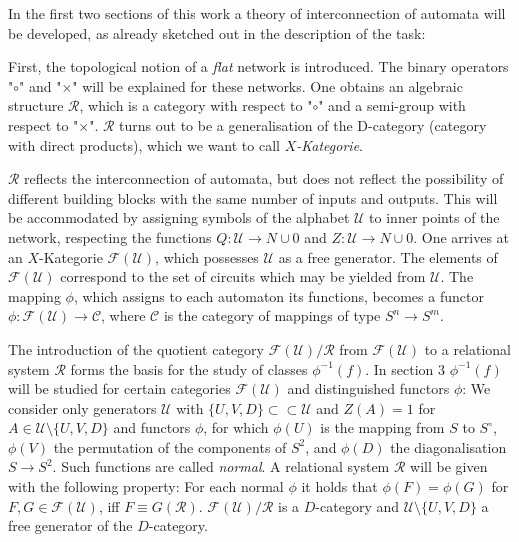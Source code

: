 \documentclass{article}
\begin{document}
In the first two sections of this work a theory of interconnection of automata will be developed, as already sketched out in the description of the task:

First, the topological notion of a \emph{flat} network is introduced. The binary operators "$\circ$" and "$\times$" will be explained for these networks. One obtains an algebraic structure $\mathcal{R}$, which is a category with respect to "$\circ$" and a semi-group with respect to "$\times$". $\mathcal{R}$ turns out to be a generalisation of the D-category (category with direct products), which we want to call \emph{$X$-Kategorie}.

$\mathcal{R}$ reflects the interconnection of automata, but does not reflect the possibility of different building blocks with the same number of inputs and outputs. This will be accommodated by assigning symbols of the alphabet $\mathcal{U}$ to inner points of the network, respecting the functions $Q : \mathcal{U} \rightarrow N \cup {0}$ and $Z : \mathcal{U} \rightarrow N \cup {0}$. One arrives at an $X$-Kategorie $\mathcal{F}(\mathcal{U})$, which possesses $\mathcal{U}$ as a free generator. The elements of $\mathcal{F}(\mathcal{U})$ correspond to the set of circuits which may be yielded from $\mathcal{U}$. The mapping $\phi$, which assigns to each automaton its functions, becomes a functor $\phi:\mathcal{F}(\mathcal{U}) \rightarrow \mathcal{C}$, where $\mathcal{C}$ is the category of mappings of type $S^n \rightarrow S^m$. 

The introduction of the quotient category  $\mathcal{F}(\mathcal{U})/\mathcal{R}$ from $\mathcal{F}(\mathcal{U})$ to a relational system $\mathcal{R}$ forms the basis for the study of classes $\phi^{-1}(f)$. In section 3 $\phi^{-1}(f)$ will be studied for certain categories $\mathcal{F(U)}$ and distinguished functors $\phi$: We consider only generators $\mathcal{U}$ with $\{U, V, D\} \subset \subset \mathcal{U}$ and $Z(A) = 1$ for $A\in \mathcal{U} \setminus \{U, V, D\}$ and functors $\phi$, for which $\phi(U)$ is the mapping from $S$
to $S^{\circ}$, $\phi(V)$ the permutation of the components of $S^2$, and $\phi(D)$ the diagonalisation $S \rightarrow S^2$. Such functions are called \emph{normal}. A relational system $\mathcal{R}$ will be given with the following property: For each normal $\phi$ it holds that $\phi(F) = \phi(G)$ for $F, G \in \mathcal{F}(\mathcal{U})$, iff $F\equiv G(\mathcal{R})$. $\mathcal{F}(\mathcal{U})/\mathcal{R}$ is a $D$-category and $\mathcal{U} \setminus \{U, V, D\}$ a free generator of the
$D$-category.
\end{document}
